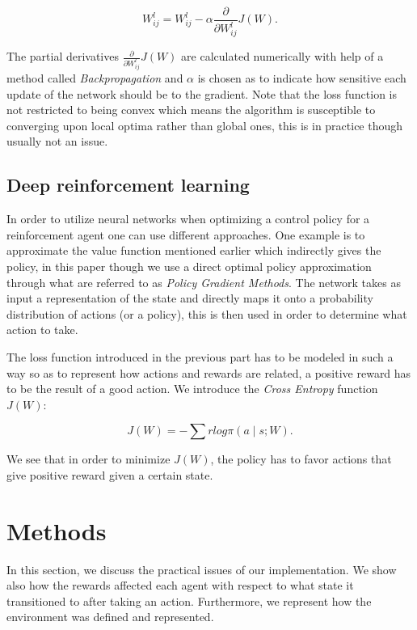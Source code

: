 \documentclass[journal,twoside]{IEEEtran}
\begin{document}
\begin{equation}
\label{5}
W^{l}_{ij} = W^{l}_{ij}-\alpha\frac{\partial}{\partial W^{l}_{ij}}J(W).
\end{equation}

The partial derivatives $\frac{\partial}{\partial W^{l}_{ij}}J(W)$ are calculated numerically with help of a method called \textit{Backpropagation} \cite{BP} and $\alpha$ is chosen as to indicate how sensitive each update of the network should be to the gradient. Note that the loss function is not restricted to being convex which means the algorithm is susceptible to converging upon local optima rather than global ones, this is in practice though usually not an issue. 

\subsection{Deep reinforcement learning}

In order to utilize neural networks when optimizing a control policy for a reinforcement agent one can use different approaches. One example is to approximate the value function mentioned earlier which indirectly gives the policy, in this paper though we use a direct optimal policy approximation through what are referred to as \textit{Policy Gradient Methods}. The network takes as input a representation of the state and directly maps it onto a probability distribution of actions (or a policy), this is then used in order to determine what action to take. 

The loss function introduced in the previous part has to be modeled in such a way so as to represent how actions and rewards are related, a positive reward has to be the result of a good action. We introduce the \textit{Cross Entropy} function $J(W)$:

\begin{equation}
J(W)=-\sum rlog\pi(a\mid s;W).
\end{equation}

We see that in order to minimize $J(W)$, the policy has to favor actions that give positive reward given a certain state.

\section{Methods}

In this section, we discuss the practical issues of our implementation. We show also how the rewards affected each agent with respect to what state it transitioned to after taking an action. Furthermore, we represent how the environment was defined and represented.
\end{document}
